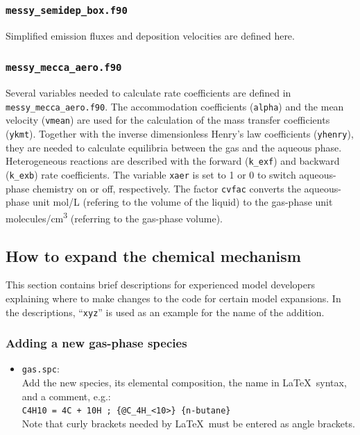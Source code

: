 \documentclass[twoside]{article}
\def\nosep{\setlength\parsep{0mm}\setlength\topsep{0mm}\setlength\itemsep{0mm}}
\begin{document}
\subsubsection{{\tt messy\_semidep\_box.f90}}

Simplified emission fluxes and deposition velocities are defined here.

\subsubsection{{\tt messy\_mecca\_aero.f90}}

Several variables needed to calculate rate coefficients are defined in
\verb|messy_mecca_aero.f90|. The accommodation coefficients
(\verb|alpha|) and the mean velocity (\verb|vmean|) are used for the
calculation of the mass transfer coefficients (\verb|ykmt|). Together
with the inverse dimensionless Henry's law coefficients (\verb|yhenry|),
they are needed to calculate equilibria between the gas and the aqueous
phase. Heterogeneous reactions are described with the forward
(\verb|k_exf|) and backward (\verb|k_exb|) rate coefficients. The
variable \verb|xaer| is set to 1 or 0 to switch aqueous-phase chemistry
on or off, respectively. The factor \verb|cvfac| converts the
aqueous-phase unit \unit{mol/L} (refering to the volume of the liquid)
to the gas-phase unit \unit{molecules/cm^3} (referring to the gas-phase
volume).

\subsection{How to expand the chemical mechanism}

This section contains brief descriptions for experienced model
developers explaining where to make changes to the code for certain
model expansions. In the descriptions, ``\verb|xyz|'' is used as an
example for the name of the addition.

\subsubsection{Adding a new gas-phase species}

\begin{itemize}\nosep
\item \verb|gas.spc|:\\
  Add the new species, its elemental composition,
  the name in La\TeX\ syntax, and a comment, e.g.:\\
  \verb|C4H10 = 4C + 10H ; {@C_4H_<10>} {n-butane}|\\
  Note that curly brackets needed by La\TeX\ must be entered as angle
  brackets.
\end{itemize}
\end{document}
